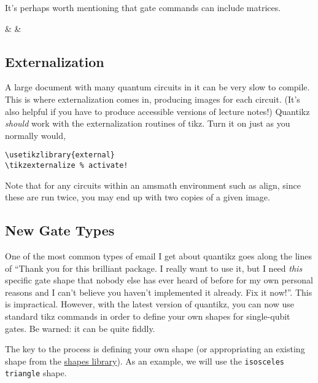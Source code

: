 \documentclass[aps,pra,10pt,nofootinbib]{revtex4-2}
\begin{document}
It's perhaps worth mentioning that gate commands can include matrices.
\begin{Code}
  \begin{quantikz}
     &  & \rstick{\ket{+}}
  \end{quantikz}
\end{Code}


\subsection{Externalization}

A large document with many quantum circuits in it can be very slow to compile. This is where externalization comes in, producing images for each circuit. (It's also helpful if you have to produce accessible versions of lecture notes!) Quantikz \emph{should} work with the externalization routines of tikz. Turn it on just as you normally would,
\begin{FullCode}
  \begin{lstlisting}
\usetikzlibrary{external}
\tikzexternalize % activate!
\end{lstlisting}
\end{FullCode}
Note that for any circuits within an amsmath environment such as align, since these are run twice, you may end up with two copies of a given image.


\subsection{New Gate Types}

One of the most common types of email I get about quantikz goes along the lines of ``Thank you for this brilliant package. I really want to use it, but I need \emph{this} specific gate shape that nobody else has ever heard of before for my own personal reasons and I can't believe you haven't implemented it already. Fix it now!''. This is impractical. However, with the latest version of quantikz, you can now use standard tikz commands in order to define your own shapes for single-qubit gates. Be warned: it can be quite fiddly.

The key to the process is defining your own shape (or appropriating an existing shape from the \href{https://tikz.dev/library-shapes}{shapes library}). As an example, we will use the \texttt{isosceles triangle} shape.
\end{document}

